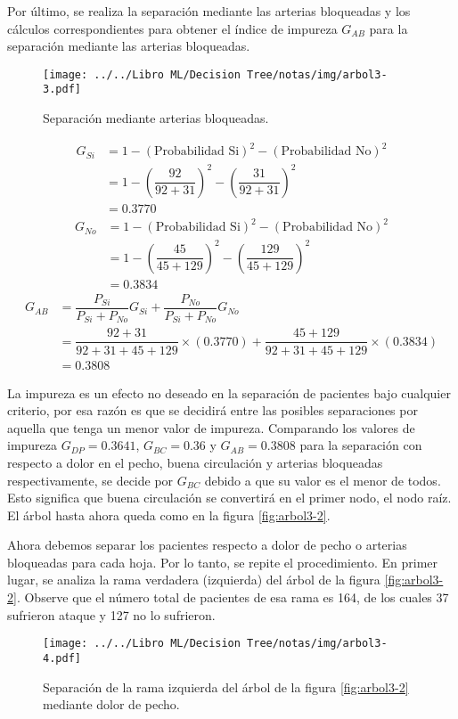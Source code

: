 \documentclass[
10pt, %
a4paper, %
]{article}
\begin{document}
Por último, se realiza la separación mediante las arterias bloqueadas y los cálculos correspondientes para obtener el índice de impureza $G_{AB}$ para la separación
mediante las arterias bloqueadas.
\begin{figure}[H]
	\centering
	\texttt{[image: ../../Libro ML/Decision Tree/notas/img/arbol3-3.pdf]}
	\caption{Separación mediante arterias bloqueadas.}
	\label{fig:arbol3-3}
\end{figure}
\begin{align*}
	G_{Si} &= 1 - (\mbox{Probabilidad Si})^2 - (\mbox{Probabilidad No})^2  \\
		&= 1-\left(\dfrac{92}{92+31}\right)^2 - \left(\dfrac{31}{92+31} \right)^2\\
		&= 0.3770
\end{align*}
\begin{align*}
	G_{No} &= 1 - (\mbox{Probabilidad Si})^2 - (\mbox{Probabilidad No})^2  \\
		&= 1-\left(\dfrac{45}{45+129}\right)^2 - \left(\dfrac{129}{45+129}\right)^2\\
		&= 0.3834
\end{align*}
\begin{align*}
	G_{AB} &= \dfrac{P_{Si}}{P_{Si} + P_{No}}G_{Si} + \dfrac{P_{No}}{P_{Si}+P_{No}}G_{No} \\
		&= \dfrac{92+31}{92+31+45+129}\times (0.3770) + \dfrac{45+129}{92+31+45+129}\times (0.3834)\\
		&= 0.3808
\end{align*}

La impureza es un efecto no deseado en la separación de pacientes bajo cualquier criterio, por esa razón es que se decidirá entre las posibles separaciones por aquella
que tenga un menor valor de impureza. Comparando los valores de impureza $G_{DP} = 0.3641$, $G_{BC} = 0.36$ y $G_{AB} = 0.3808$ para la separación con respecto a dolor en 
el pecho, buena circulación y arterias bloqueadas respectivamente, se decide por $G_{BC}$ debido a que su valor es el menor de todos. Esto significa que buena circulación
se convertirá en el primer nodo, el nodo raíz. El árbol hasta ahora queda como en la figura \ref{fig:arbol3-2}.

Ahora debemos separar los pacientes respecto a dolor de pecho o arterias bloqueadas para cada hoja. Por lo tanto, se repite el procedimiento.
En primer lugar, se analiza la rama verdadera (izquierda) del árbol de la figura \ref{fig:arbol3-2}. Observe que el número total de pacientes de esa rama es 164, de los
cuales 37 sufrieron ataque y 127 no lo sufrieron.
\begin{figure}[H]
	\centering
	\texttt{[image: ../../Libro ML/Decision Tree/notas/img/arbol3-4.pdf]}
	\caption{Separación de la rama izquierda del árbol de la figura \ref{fig:arbol3-2} mediante dolor de pecho.}
	\label{fig:arbol3-4}
\end{figure}
\end{document}
